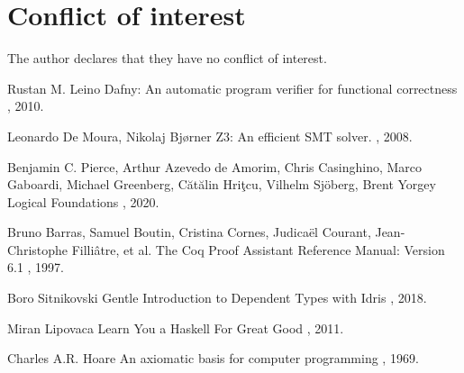 \documentclass{article}
\begin{document}
\section{Conflict of interest}

The author declares that they have no conflict of interest.

\begin{thebibliography}{1}

Rustan M. Leino
\newblock Dafny: An automatic program verifier for functional correctness
, 2010.

Leonardo De Moura, Nikolaj Bjørner
\newblock Z3: An efficient SMT solver.
, 2008.

Benjamin C. Pierce, Arthur Azevedo de Amorim, Chris Casinghino, Marco Gaboardi, Michael Greenberg, Cătălin Hriţcu, Vilhelm Sjöberg, Brent Yorgey
\newblock Logical Foundations
, 2020.

Bruno Barras, Samuel Boutin, Cristina Cornes, Judicaël Courant, Jean-Christophe Filliâtre, et al.
\newblock The Coq Proof Assistant Reference Manual: Version 6.1
, 1997.

Boro Sitnikovski
\newblock Gentle Introduction to Dependent Types with Idris
, 2018.

Miran Lipovaca
\newblock Learn You a Haskell For Great Good
, 2011.

Charles A.R. Hoare
\newblock An axiomatic basis for computer programming
, 1969.

\end{thebibliography}
\end{document}
